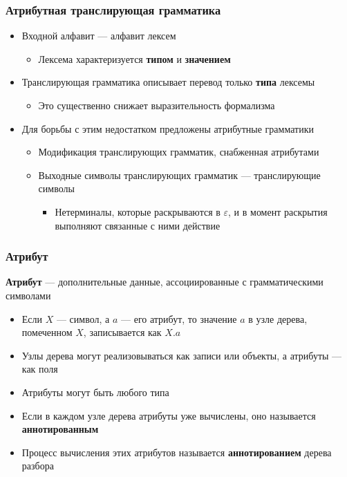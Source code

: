 \documentclass{beamer}
\begin{document}
\begin{frame}[fragile]
  \transwipe[direction=90]
  \frametitle{Атрибутная транслирующая грамматика}
  \begin{itemize}
    \item Входной алфавит --- алфавит лексем
    \begin{itemize}
      \item Лексема характеризуется \textbf{типом} и \textbf{значением}
    \end{itemize}
    \item Транслирующая грамматика описывает перевод только \textbf{типа} лексемы
    \begin{itemize}
      \item Это существенно снижает выразительность формализма
    \end{itemize}
    \item Для борьбы с этим недостатком предложены атрибутные грамматики
    \begin{itemize}
      \item Модификация транслирующих грамматик, снабженная атрибутами
      \item Выходные символы транслирующих грамматик --- транслирующие символы
      \begin{itemize}
        \item Нетерминалы, которые раскрываются в $\varepsilon$, и в момент раскрытия выполняют связанные с ними действие
      \end{itemize}
    \end{itemize}
  \end{itemize}
\end{frame}


\begin{frame}[fragile]
  \transwipe[direction=90]
  \frametitle{Атрибут}

\begin{center}
    \textbf{Атрибут} --- дополнительные данные, ассоциированные с грамматическими символами
\end{center}
  \begin{itemize}
    \item Если $X$ --- символ, а $a$ --- его атрибут, то значение $a$ в узле дерева, помеченном $X$, записывается как $X.a$
    \item Узлы дерева могут реализовываться как записи или объекты, а атрибуты --- как поля
    \item Атрибуты могут быть любого типа 
    \item Если в каждом узле дерева атрибуты уже вычислены, оно называется \textbf{аннотированным}
    \item Процесс вычисления этих атрибутов называется \textbf{аннотированием} дерева разбора
  \end{itemize}
\end{frame}
\end{document}
